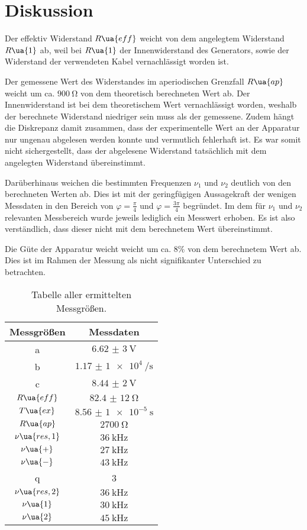 \section{Diskussion}

Der effektiv Widerstand $R\ua{eff}$ weicht von dem angelegtem Widerstand $R\ua{1}$
ab, weil bei $R\ua{1}$ der Innenwiderstand des Generators, sowie der
Widerstand der verwendeten Kabel vernachlässigt worden ist.

Der gemessene Wert des Widerstandes im aperiodischen Grenzfall $R\ua{ap}$
weicht um ca. $\SI{900}{\ohm}$ von dem theoretisch berechneten Wert ab.
Der Innenwiderstand ist bei dem theoretischem Wert vernachlässigt
worden, weshalb der berechnete Widerstand niedriger sein muss als der gemessene.
Zudem hängt die Diskrepanz damit zusammen, dass der experimentelle Wert an der Apparatur
nur ungenau abgelesen werden konnte und vermutlich fehlerhaft ist. Es war somit nicht
sichergestellt, dass der abgelesene Widerstand tatsächlich mit dem angelegten
Widerstand übereinstimmt.

Darüberhinaus weichen die bestimmten Frequenzen $\nu_1$ und $\nu_2$ deutlich von den
berechneten Werten ab. Dies ist mit der geringfügigen Aussagekraft der wenigen
Messdaten in den Bereich von $\varphi = \frac{\pi}{4}$ und $\varphi = \frac{3\pi}{4}$
begründet. Im dem für $\nu_1$ und $\nu_2$ relevanten Messbereich wurde
jeweils lediglich ein Messwert erhoben. Es ist also verständlich, dass dieser
nicht mit dem berechnetem Wert übereinstimmt.

Die Güte der Apparatur weicht weicht um ca. $8\%$ von dem berechnetem Wert ab.
Dies ist im Rahmen der Messung als nicht signifikanter Unterschied zu betrachten.


\begin{table}
 \centering
 \begin{tabular}[width=\textwidth]{S S}
     \toprule
     {Messgrößen} & {Messdaten} \\
     \midrule
       a & $\SI{6,62(3)}{\volt}$ \\
       b & $\SI{1,17(1)e4}{\per\second}$ \\
       c & $\SI{8,44(2)}{\volt}$ \\
      $R\ua{eff}$ & $\SI{82,4(12)}{\ohm}$ \\
      $T\ua{ex}$ & $\SI{8,56(1)e-5}{\second}$ \\
      $R\ua{ap}$ & $\SI{2700}{\ohm}$ \\
      $\nu\ua{res,1}$ & $\SI{36}{\kilo\hertz}$ \\
      $\nu\ua{+}$ & $\SI{27}{\kilo\hertz}$ \\
      $\nu\ua{-}$ & $\SI{43}{\kilo\hertz}$ \\
      q & 3 \\
      $\nu\ua{res,2}$ & $\SI{36}{\kilo\hertz}$ \\
      $\nu\ua{1}$ & $\SI{30}{\kilo\hertz}$ \\
      $\nu\ua{2}$ & $\SI{45}{\kilo\hertz}$ \\
      \bottomrule
  \end{tabular}
  \caption{Tabelle aller ermittelten Messgrößen.}
  \label{tab:Messdaten}
\end{table}
